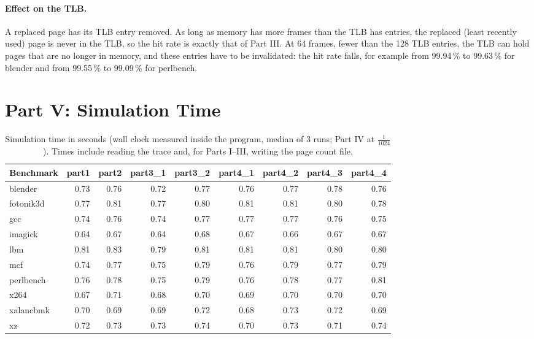 \documentclass[11pt,a4paper]{article}
\begin{document}
\paragraph{Effect on the TLB.} A replaced page has its TLB entry removed. As long as memory has
more frames than the TLB has entries, the replaced (least recently used) page is never in the TLB,
so the hit rate is exactly that of Part III. At 64 frames, fewer than the 128 TLB entries, the TLB
can hold pages that are no longer in memory, and these entries have to be invalidated: the hit rate
falls, for example from 99.94\,\% to 99.63\,\% for blender and from 99.55\,\% to 99.09\,\% for
perlbench.

\section{Part V: Simulation Time}

\begin{table}[H]
\centering\small
\begin{tabular}{@{}lrrrrrrrr@{}}
\toprule
Benchmark & part1 & part2 & part3\_1 & part3\_2 & part4\_1 & part4\_2 & part4\_3 & part4\_4 \\
\midrule
blender   & 0.73 & 0.76 & 0.72 & 0.77 & 0.76 & 0.77 & 0.78 & 0.76 \\
fotonik3d & 0.77 & 0.81 & 0.77 & 0.80 & 0.81 & 0.81 & 0.80 & 0.78 \\
gcc       & 0.74 & 0.76 & 0.74 & 0.77 & 0.77 & 0.77 & 0.76 & 0.75 \\
imagick   & 0.64 & 0.67 & 0.64 & 0.68 & 0.67 & 0.66 & 0.67 & 0.67 \\
lbm       & 0.81 & 0.83 & 0.79 & 0.81 & 0.81 & 0.81 & 0.80 & 0.80 \\
mcf       & 0.74 & 0.77 & 0.75 & 0.79 & 0.76 & 0.79 & 0.77 & 0.79 \\
perlbench & 0.76 & 0.78 & 0.75 & 0.79 & 0.76 & 0.78 & 0.77 & 0.81 \\
x264      & 0.67 & 0.71 & 0.68 & 0.70 & 0.69 & 0.70 & 0.70 & 0.70 \\
xalancbmk & 0.70 & 0.69 & 0.69 & 0.72 & 0.68 & 0.73 & 0.72 & 0.69 \\
xz        & 0.72 & 0.73 & 0.73 & 0.74 & 0.70 & 0.73 & 0.71 & 0.74 \\
\bottomrule
\end{tabular}
\caption{Simulation time in seconds (wall clock measured inside the program, median of 3 runs;
Part IV at $\frac{1}{1024}$). Times include reading the trace and, for Parts I--III, writing the
page count file.}
\label{tab:time}
\end{table}
\end{document}
